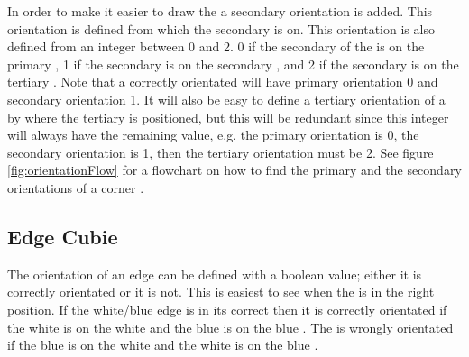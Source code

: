 In order to make it easier to draw the \rubik{} a secondary orientation is added. This orientation is defined from which \face{} the secondary \facelet{} is on.
This orientation is also defined from an integer between 0 and 2.
0 if the secondary \facelet{} of the \cubie{} is on the primary \face{}, 1 if the secondary \facelet{} is on the secondary \face{}, and 2 if the secondary \facelet{} is on the tertiary \face{}.
Note that a correctly orientated \cubie{} will have primary orientation 0 and secondary orientation 1.
It will also be easy to define a tertiary orientation of a \cubie{} by where the tertiary \facelet{} is positioned, but this will be redundant since this integer will always have the remaining value, e.g. the primary orientation is 0, the secondary orientation is 1, then the tertiary orientation must be 2.
See figure \ref{fig:orientationFlow} for a flowchart on how to find the primary and the secondary orientations of a corner \cubie{}.

\subsection{Edge Cubie}
The orientation of an edge \cubie{} can be defined with a boolean value; either it is correctly orientated or it is not.
This is easiest to see when the \cubie{} is in the right position.
If the white/blue edge \cubie{} is in its correct \cubicle{} then it is correctly orientated if the white \facelet{} is on the white \face{} and the blue \facelet{} is on the blue \face{}.
The \cubie{} is wrongly orientated if the blue \facelet{} is on the white \face{} and the white \facelet{} is on the blue \face{}.

